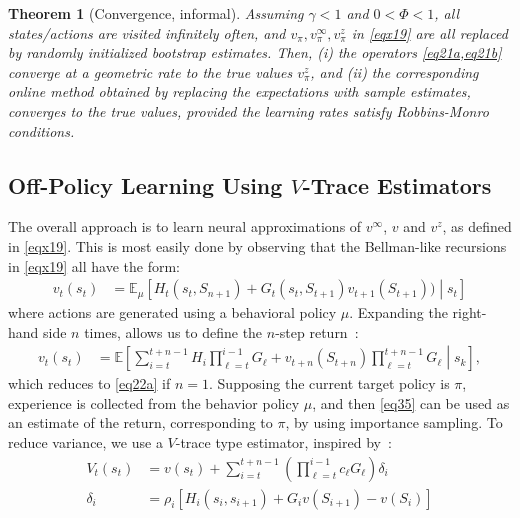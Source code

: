 \documentclass[letterpaper]{article} %
\newcommand{\EE}{\mathbb{E}}
\newtheorem{theorem}{Theorem}%
\begin{document}
	\begin{theorem}[Convergence, informal]	\label{T1}
		Assuming $\gamma<1$ and $0<\Phi<1$, all states/actions are visited infinitely often, and $v_\pi, v^\infty_\pi, v^z_\pi$ in \cref{eqx19} are all replaced by randomly initialized bootstrap estimates. Then, (i) the operators \cref{eq21a,eq21b} converge at a geometric rate to the true values $v^z_\pi$, and (ii) the corresponding online method obtained by replacing the expectations with sample estimates, converges to the true values, provided the learning rates satisfy Robbins-Monro conditions. 
	\end{theorem}
	
	
	\subsection{Off-Policy Learning Using $V$-Trace Estimators}
	The overall approach is to learn neural approximations of $v^\infty$, $v$ and $v^z$, as defined in \cref{eqx19}. This is most easily done by observing that the Bellman-like recursions in \cref{eqx19} all have the form:
	\begin{align}
		v_t(s_t) & =\EE_\mu\left[H_t(s_t,S_{n+1})  + G_t(s_t, S_{t+1}) v_{t+1}(S_{t+1} )  )  \middle| s_t\right] \label{eq22a}
	\end{align}
	where actions are generated using a behavioral policy $\mu$. %
	Expanding the right-hand side $n$ times, allows us to define the $n$-step return~\cite{espeholt2018impala}:
	\begin{align}  
		v_t(s_t) & =\EE\left[ \sum_{i=t}^{t+n-1} H_i \prod_{\ell=t}^{i-1} G_\ell + v_{t+n}(S_{t+n})  \prod_{\ell = t}^{ t+n-1} G_\ell   \middle| s_k\right], \label{eq35}
	\end{align}
	which reduces to \cref{eq22a} if $n=1$. Supposing the current target policy is $\pi$, experience is collected from the behavior policy $\mu$, and then \cref{eq35} can be used as an estimate of the return, corresponding to $\pi$, by using importance sampling. To reduce variance, we use a $V$-trace type estimator, inspired by~\citet{espeholt2018impala}: 
	\begin{subequations}
		\begin{align}
			V_t(s_t) &= v(s_t) + \sum_{i=t}^{t+n-1} \left( \prod_{\ell=t}^{i-1} c_\ell G_{\ell} \right)	\delta_i \label{eq24a} \\
			\delta_i & = \rho_i \left[ H_i(s_i, s_{i+1}) + G_i v(S_{i+1})- v(S_i) \right]  
		\end{align} \label{eq22}
	\end{subequations}
\end{document}

